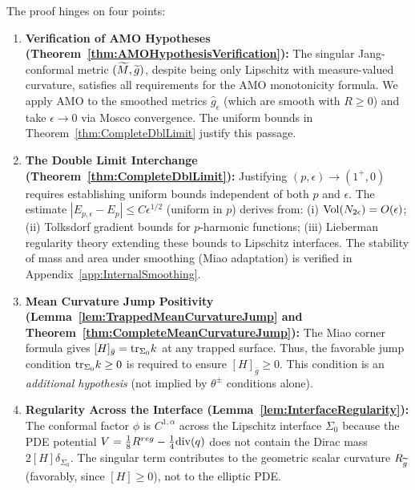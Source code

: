 \begin{remark}\label{rem:VerificationSummary}
The proof hinges on four points:

\begin{enumerate}
    \item \textbf{Verification of AMO Hypotheses (Theorem~\ref{thm:AMOHypothesisVerification}):}
    The singular Jang-conformal metric $(\widetilde{M}, \widetilde{g})$, despite being only Lipschitz with measure-valued curvature, satisfies all requirements for the AMO monotonicity formula. We apply AMO to the smoothed metrics $\hat{g}_\epsilon$ (which are smooth with $R \ge 0$) and take $\epsilon \to 0$ via Mosco convergence. The uniform bounds in Theorem~\ref{thm:CompleteDblLimit} justify this passage.
    
    \item \textbf{The Double Limit Interchange (Theorem~\ref{thm:CompleteDblLimit}):}
    Justifying $(p, \epsilon) \to (1^+, 0)$ requires establishing uniform bounds independent of both $p$ and $\epsilon$. The estimate $|E_{p,\epsilon} - E_p| \le C\epsilon^{1/2}$ (uniform in $p$) derives from: (i) $\operatorname{Vol}(N_{2\epsilon}) = O(\epsilon)$; (ii) Tolksdorf gradient bounds for $p$-harmonic functions; (iii) Lieberman regularity theory extending these bounds to Lipschitz interfaces. The stability of mass and area under smoothing (Miao adaptation) is verified in Appendix~\ref{app:InternalSmoothing}.
    
    \item \textbf{Mean Curvature Jump Positivity (Lemma~\ref{lem:TrappedMeanCurvatureJump} and Theorem~\ref{thm:CompleteMeanCurvatureJump}):}
    The Miao corner formula gives $[H]_{\bar{g}} = \mathrm{tr}_{\Sigma_0} k$ at any trapped surface. Thus, the favorable jump condition $\mathrm{tr}_{\Sigma_0} k \ge 0$ is required to ensure $[H]_{\bar{g}} \ge 0$. This condition is an \emph{additional hypothesis} (not implied by $\theta^\pm$ conditions alone).
    
    \item \textbf{Regularity Across the Interface (Lemma~\ref{lem:InterfaceRegularity}):}
    The conformal factor $\phi$ is $C^{1,\alpha}$ across the Lipschitz interface $\Sigma_0$ because the PDE potential $V = \frac{1}{8}R^{reg} - \frac{1}{4}\mathrm{div}(q)$ does not contain the Dirac mass $2[H]\delta_{\Sigma_0}$. The singular term contributes to the geometric scalar curvature $R_{\widetilde{g}}$ (favorably, since $[H] \ge 0$), not to the elliptic PDE.
\end{enumerate}
\end{remark}

